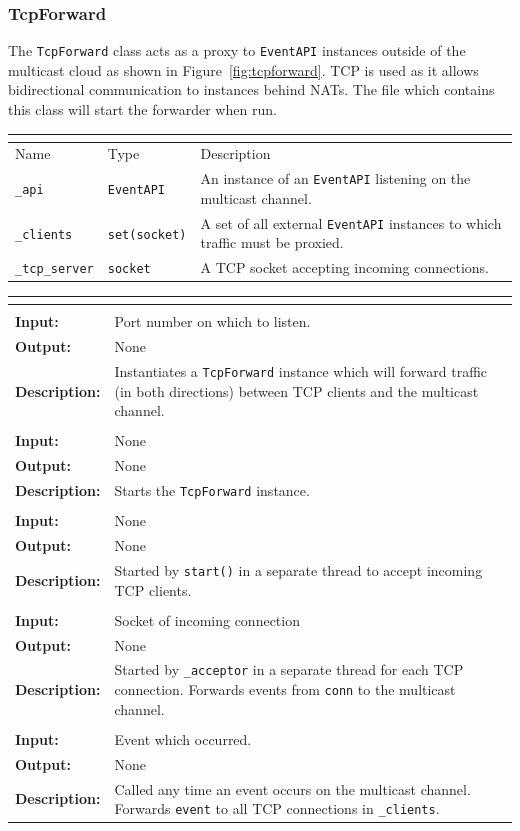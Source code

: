 \documentclass[titlepage]{article}
\newcommand{\operations}[1]{
\begin{center}
    \begin{longtable}{|p{4cm}|p{10cm + 2.0\tabcolsep}|}
    \hline
    \multicolumn{2}{|l|}{\cellcolor[gray]{0.5}{\textbf{Operations}}} \\ \hline
#1
    \end{longtable}
\end{center}
}
\newcommand{\operation}[4]{
    \hline
    \multicolumn{2}{|l|}{\cellcolor[gray]{0.8}{\texttt{#1}}} \\ \hline
    \hspace{7pt}\textbf{Input:} & #2 \\ \hline
    \hspace{7pt}\textbf{Output:} & #3 \\ \hline
    \hspace{7pt}\textbf{Description:} & #4 \\ \hline
}
\newcommand{\attributes}[1]{
    \begin{center}
        \begin{tabular}{|p{3.5cm}|p{3.5cm}|p{7cm}|}
            \multicolumn{3}{|l|}{\cellcolor[gray]{0.5}{\textbf{Attributes}}} \\ \hline
            \rowcolor[gray]{0.8} Name & Type & Description \\ \hline 
            #1
        \end{tabular}
    \end{center}
}
\newcommand{\attribute}[3]{
    \texttt{#1} & \texttt{#2} & #3 \\ \hline
}
\begin{document}
\subsubsection{TcpForward}{The \texttt{TcpForward} class acts as a proxy to \texttt{EventAPI} instances outside of the multicast cloud as shown in Figure~\ref{fig:tcpforward}.  TCP is used as it allows bidirectional communication to instances behind NATs.  The file which contains this class will start the forwarder when run.}
\attributes
{
    \attribute{\_api}{EventAPI}{An instance of an \texttt{EventAPI} listening on the multicast channel.}
    \attribute{\_clients}{set(socket)}{A set of all external \texttt{EventAPI} instances to which traffic must be proxied.}
    \attribute{\_tcp\_server}{socket}{A TCP socket accepting incoming connections.}
}

\operations
{
    \operation{\_\_init\_\_(port)}{Port number on which to listen.}{None}{Instantiates a \texttt{TcpForward} instance which will forward traffic (in both directions) between TCP clients and the multicast channel.}
    \operation{start()}{None}{None}{Starts the \texttt{TcpForward} instance.}
    \operation{\_acceptor()}{None}{None}{Started by \texttt{start()} in a separate thread to accept incoming TCP clients.}
    \operation{\_listener(conn)}{Socket of incoming connection}{None}{Started by \texttt{\_acceptor} in a separate thread for each TCP connection.  Forwards events from \texttt{conn} to the multicast channel.}
    \operation{\_on\_event(event)}{Event which occurred.}{None}{Called any time an event occurs on the multicast channel.  Forwards \texttt{event} to all TCP connections in \texttt{\_clients}.}
}
\end{document}
